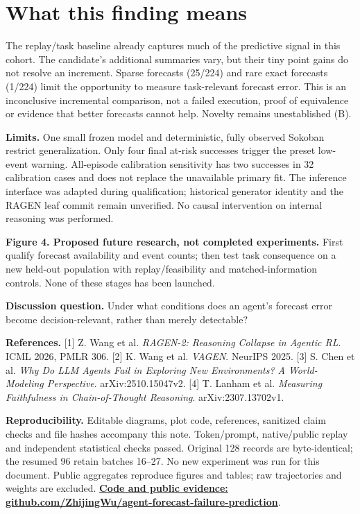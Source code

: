 \documentclass[10pt,a4paper]{article}
\newcommand{\captiontext}[1]{{\fontsize{8.8}{10.6}\selectfont\color{slate}#1\par}}
\begin{document}
\section{What this finding means}
The replay/task baseline already captures much of the predictive signal in this cohort. The candidate's additional summaries vary, but their tiny point gains do not resolve an increment. Sparse forecasts (25/224) and rare exact forecasts (1/224) limit the opportunity to measure task-relevant forecast error. This is an inconclusive incremental comparison, not a failed execution, proof of equivalence or evidence that better forecasts cannot help. Novelty remains unestablished (B).

\textbf{Limits.} One small frozen model and deterministic, fully observed Sokoban restrict generalization. Only four final at-risk successes trigger the preset low-event warning. All-episode calibration sensitivity has two successes in 32 calibration cases and does not replace the unavailable primary fit. The inference interface was adapted during qualification; historical generator identity and the RAGEN leaf commit remain unverified. No causal intervention on internal reasoning was performed.

\vspace{5pt}
\noindent\par\vspace{2pt}
\captiontext{\textbf{Figure 4. Proposed future research, not completed experiments.} First qualify forecast availability and event counts; then test task consequence on a new held-out population with replay/feasibility and matched-information controls. None of these stages has been launched.}
\vspace{4pt}
\textbf{Discussion question.} Under what conditions does an agent's forecast error become decision-relevant, rather than merely detectable?

\vspace{5pt}
{\fontsize{8.4}{10.0}\selectfont\color{slate}
\textbf{References.} [1] Z. Wang et al. \emph{RAGEN-2: Reasoning Collapse in Agentic RL}. ICML 2026, PMLR 306.
[2] K. Wang et al. \emph{VAGEN}. NeurIPS 2025.
[3] S. Chen et al. \emph{Why Do LLM Agents Fail in Exploring New Environments? A World-Modeling Perspective}. arXiv:2510.15047v2.
[4] T. Lanham et al. \emph{Measuring Faithfulness in Chain-of-Thought Reasoning}. arXiv:2307.13702v1.

\textbf{Reproducibility.} Editable diagrams, plot code, references, sanitized claim checks and file hashes accompany this note. Token/prompt, native/public replay and independent statistical checks passed. Original 128 records are byte-identical; the resumed 96 retain batches 16--27. No new experiment was run for this document. Public aggregates reproduce figures and tables; raw trajectories and weights are excluded. \href{https://github.com/ZhijingWu/agent-forecast-failure-prediction}{\textbf{Code and public evidence: github.com/ZhijingWu/agent-forecast-failure-prediction}}.}
\end{document}
